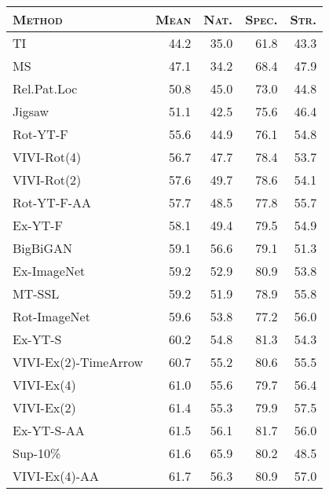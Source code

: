 \documentclass[10pt,twocolumn,letterpaper]{article}
\begin{document}
{\begin{table*}[h!]
    \centering
    \small
    \begin{tabular}{lrrrr}
\toprule
\textsc{Method}  &     \textsc{Mean} & \textsc{Nat.} & \textsc{Spec.} & \textsc{Str.} \\
\midrule
TI                      &     44.2 &     35.0 &        61.8 &       43.3 \\
MS                      &     47.1 &     34.2 &        68.4 &       47.9 \\
Rel.Pat.Loc             &     50.8 &     45.0 &        73.0 &       44.8 \\
Jigsaw                  &     51.1 &     42.5 &        75.6 &       46.4 \\
Rot-YT-F                &     55.6 &     44.9 &        76.1 &       54.8 \\
VIVI-Rot(4)             &     56.7 &     47.7 &        78.4 &       53.7 \\
VIVI-Rot(2)             &     57.6 &     49.7 &        78.6 &       54.1 \\
Rot-YT-F-AA             &     57.7 &     48.5 &        77.8 &       55.7 \\
Ex-YT-F                 &     58.1 &     49.4 &        79.5 &       54.9 \\
BigBiGAN                &     59.1 &     56.6 &        79.1 &       51.3 \\
Ex-ImageNet             &     59.2 &     52.9 &        80.9 &       53.8 \\
MT-SSL                  &     59.2 &     51.9 &        78.9 &       55.8 \\
Rot-ImageNet            &     59.6 &     53.8 &        77.2 &       56.0 \\
Ex-YT-S                 &     60.2 &     54.8 &        81.3 &       54.3 \\
VIVI-Ex(2)-TimeArrow    &     60.7 &     55.2 &        80.6 &       55.5 \\
VIVI-Ex(4)              &     61.0 &     55.6 &        79.7 &       56.4 \\
VIVI-Ex(2)              &     61.4 &     55.3 &        79.9 &       57.5 \\
Ex-YT-S-AA              &     61.5 &     56.1 &        81.7 &       56.0 \\
Sup-10\%                 &     61.6 &     65.9 &        80.2 &       48.5 \\
VIVI-Ex(4)-AA           &     61.7 &     56.3 &        80.9 &       57.0 \\

\end{tabular}
\end{table*}}
\end{document}
